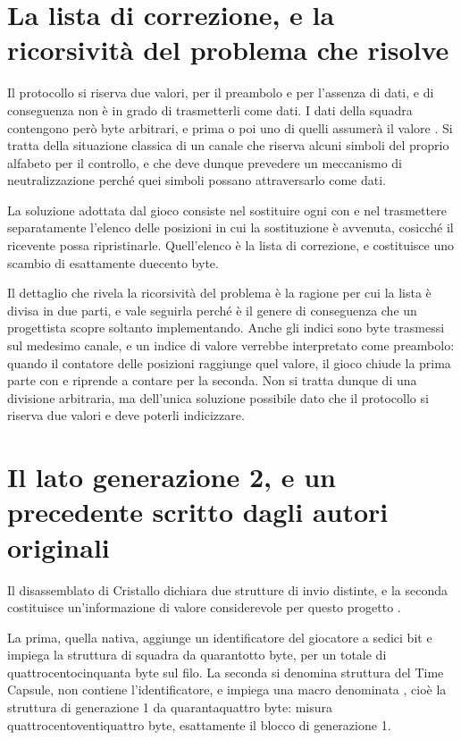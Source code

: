 \section{La lista di correzione, e la ricorsività del problema che risolve}

Il protocollo si riserva due valori,  per il preambolo e  per l'assenza di dati, e di conseguenza non è in grado di trasmetterli come dati. I dati della squadra contengono però byte arbitrari, e prima o poi uno di quelli assumerà il valore . Si tratta della situazione classica di un canale che riserva alcuni simboli del proprio alfabeto per il controllo, e che deve dunque prevedere un meccanismo di neutralizzazione perché quei simboli possano attraversarlo come dati.

La soluzione adottata dal gioco consiste nel sostituire ogni  con  e nel trasmettere separatamente l'elenco delle posizioni in cui la sostituzione è avvenuta, cosicché il ricevente possa ripristinarle. Quell'elenco è la lista di correzione, e costituisce uno scambio di esattamente duecento byte.

Il dettaglio che rivela la ricorsività del problema è la ragione per cui la lista è divisa in due parti, e vale seguirla perché è il genere di conseguenza che un progettista scopre soltanto implementando. Anche gli indici sono byte trasmessi sul medesimo canale, e un indice di valore  verrebbe interpretato come preambolo: quando il contatore delle posizioni raggiunge quel valore, il gioco chiude la prima parte con  e riprende a contare per la seconda. Non si tratta dunque di una divisione arbitraria, ma dell'unica soluzione possibile dato che il protocollo si riserva due valori e deve poterli indicizzare.

\section{Il lato generazione 2, e un precedente scritto dagli autori originali}

Il disassemblato di Cristallo dichiara due strutture di invio distinte, e la seconda costituisce un'informazione di valore considerevole per questo progetto \cite{pokecrystal}.

La prima, quella nativa, aggiunge un identificatore del giocatore a sedici bit e impiega la struttura di squadra da quarantotto byte, per un totale di quattrocentocinquanta byte sul filo. La seconda si denomina struttura del Time Capsule, non contiene l'identificatore, e impiega una macro denominata , cioè la struttura di generazione 1 da quarantaquattro byte: misura quattrocentoventiquattro byte, esattamente il blocco di generazione 1.

